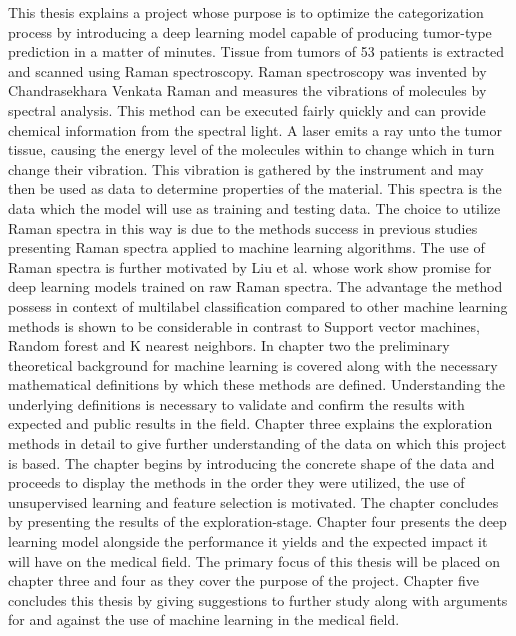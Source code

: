 This thesis explains a project whose purpose is to optimize the categorization process by introducing a deep learning model capable of producing tumor-type prediction in a matter of minutes. Tissue from tumors of 53 patients is extracted and scanned using Raman spectroscopy. Raman spectroscopy was invented by Chandrasekhara Venkata Raman and measures the vibrations of molecules by spectral analysis. This method can be executed fairly quickly and can provide chemical information from the spectral light. A laser emits a ray unto the tumor tissue, causing the energy level of the molecules within to change which in turn change their vibration. This vibration is gathered by the instrument and may then be used as data to determine properties of the material\cite{long1977raman}\cite{graves1989practical}. This spectra is the data which the model will use as training and testing data. The choice to utilize Raman spectra in this way is due to the methods success in previous studies presenting Raman spectra applied to machine learning algorithms\cite{ramanDL}\cite{ho2019rapid}. The use of Raman spectra is further motivated by Liu et al.\cite{liu2017deep} whose work show promise for deep learning models trained on raw Raman spectra. The advantage the method possess in context of multilabel classification compared to other machine learning methods is shown to be considerable in contrast to Support vector machines, Random forest and K nearest neighbors\cite{liu2017deep}. In chapter two the preliminary theoretical background for machine learning is covered along with the necessary mathematical definitions by which these methods are defined. Understanding the underlying definitions is necessary to validate and confirm the results with expected and public results in the field. Chapter three explains the exploration methods in detail to give further understanding of the data on which this project is based. The chapter begins by introducing the concrete shape of the data and proceeds to display the methods in the order they were utilized, the use of unsupervised learning and feature selection is motivated. The chapter concludes by presenting the results of the exploration-stage. Chapter four presents the deep learning model alongside the performance it yields and the expected impact it will have on the medical field. The primary focus of this thesis will be placed on chapter three and four as they cover the purpose of the project. Chapter five concludes this thesis by giving suggestions to further study along with arguments for and against the use of machine learning in the medical field.

